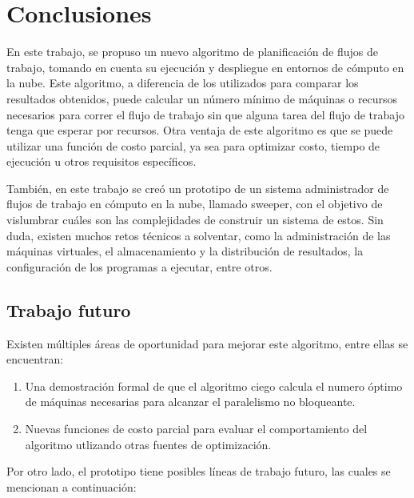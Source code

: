 \chapter{Conclusiones}
\label{chap:conclusions}

En este trabajo, se propuso un nuevo algoritmo de planificación de flujos de trabajo, tomando en cuenta su ejecución y despliegue en entornos de cómputo en la nube. Este algoritmo, a diferencia de los utilizados para comparar los resultados obtenidos, puede calcular un número mínimo de máquinas o recursos necesarios para correr el flujo de trabajo sin que alguna tarea del flujo de trabajo tenga que esperar por recursos. Otra ventaja de este algoritmo es que se puede utilizar una funci\'on de costo parcial, ya sea para optimizar costo, tiempo de ejecuci\'on u otros requisitos espec\'ificos.

Tambi\'en, en este trabajo se cre\'o un prototipo de un sistema administrador de flujos de trabajo en cómputo en la nube, llamado sweeper, con el objetivo de vislumbrar cu\'ales son las complejidades de construir un sistema de estos. Sin duda, existen muchos retos t\'ecnicos a solventar, como la administraci\'on de las m\'aquinas virtuales, el almacenamiento y la distribuci\'on de resultados, la configuraci\'on de los programas a ejecutar, entre otros.


\section{Trabajo futuro}

Existen múltiples áreas de oportunidad para mejorar este algoritmo, entre ellas se encuentran:

\begin{enumerate}
\item{Una demostraci\'on formal de que el algoritmo ciego calcula el numero \'optimo de m\'aquinas necesarias para alcanzar el paralelismo no bloqueante.}
\item{Nuevas funciones de costo parcial para evaluar el comportamiento del algoritmo utlizando otras fuentes de optimizaci\'on.}
\end{enumerate}

Por otro lado, el prototipo tiene posibles l\'ineas de trabajo futuro, las cuales se mencionan a continuaci\'on:

